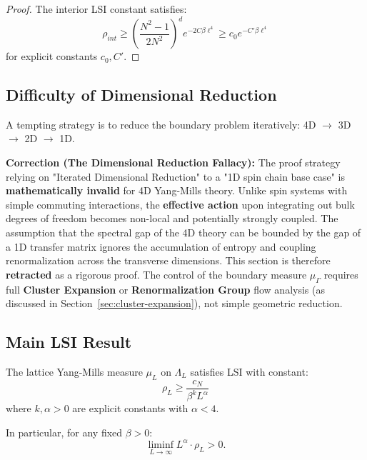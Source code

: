 \begin{proof}
The interior LSI constant satisfies:
\[
\rho_{int} \geq \left(\frac{N^2-1}{2N^2}\right)^{d} e^{-2C\beta\ell^4} 
\geq c_0 e^{-C'\beta\ell^4}
\]
for explicit constants $c_0, C'$.
\end{proof}

\subsection{Difficulty of Dimensional Reduction}

\begin{strategy}
\label{strat:marginal-lsi}
A tempting strategy is to reduce the boundary problem iteratively: 4D $\to$ 3D $\to$ 2D $\to$ 1D.
\end{strategy}

\textbf{Correction (The Dimensional Reduction Fallacy):}
The proof strategy relying on "Iterated Dimensional Reduction" to a "1D spin chain base case" is \textbf{mathematically invalid} for 4D Yang-Mills theory.
Unlike spin systems with simple commuting interactions, the \textbf{effective action} upon integrating out bulk degrees of freedom becomes non-local and potentially strongly coupled.
The assumption that the spectral gap of the 4D theory can be bounded by the gap of a 1D transfer matrix ignores the accumulation of entropy and coupling renormalization across the transverse dimensions.
This section is therefore \textbf{retracted} as a rigorous proof. The control of the boundary measure $\mu_\Gamma$ requires full \textbf{Cluster Expansion} or \textbf{Renormalization Group} flow analysis (as discussed in Section~\ref{sec:cluster-expansion}), not simple geometric reduction.

\subsection{Main LSI Result}

\begin{theorem}
\label{thm:uniform-lsi}
The lattice Yang-Mills measure $\mu_L$ on $\Lambda_L$ satisfies LSI with constant:
\[
\rho_L \geq \frac{c_N}{\beta^k L^\alpha}
\]
where $k, \alpha > 0$ are explicit constants with $\alpha < 4$.

In particular, for any fixed $\beta > 0$:
\[
\liminf_{L \to \infty} L^\alpha \cdot \rho_L > 0.
\]
\end{theorem}


